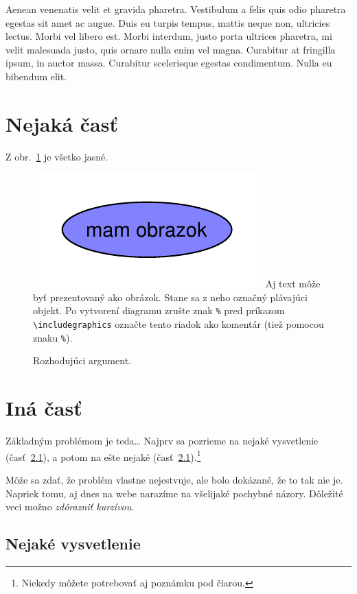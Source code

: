 \documentclass[10pt,twoside,slovak,a4paper]{article}
\begin{document}
Aenean venenatis velit et gravida pharetra. Vestibulum a felis quis odio pharetra egestas sit amet ac augue. Duis eu turpis tempus, mattis neque non, ultricies lectus. Morbi vel libero est. Morbi interdum, justo porta ultrices pharetra, mi velit malesuada justo, quis ornare nulla enim vel magna. Curabitur at fringilla ipsum, in auctor massa. Curabitur scelerisque egestas condimentum. Nulla eu bibendum elit.


\section{Nejaká časť} \label{nejaka}

Z obr.~\ref{f:rozhod} je všetko jasné. 

\begin{figure}[tbh]
\centering
\includegraphics[scale=1.0]{graf.pdf}
Aj text môže byť prezentovaný ako obrázok. Stane sa z neho označný plávajúci objekt. Po vytvorení diagramu zrušte znak \texttt{\%} pred príkazom \verb|\includegraphics| označte tento riadok ako komentár (tiež pomocou znaku \texttt{\%}).
\caption{Rozhodujúci argument.}
\label{f:rozhod}
\end{figure}



\section{Iná časť} \label{ina}

Základným problémom je teda\ldots{} Najprv sa pozrieme na nejaké vysvetlenie (časť~\ref{ina:nejake}), a potom na ešte nejaké (časť~\ref{ina:nejake}).\footnote{Niekedy môžete potrebovať aj poznámku pod čiarou.}

Môže sa zdať, že problém vlastne nejestvuje, ale bolo dokázané, že to tak nie je. Napriek tomu, aj dnes na webe narazíme na všelijaké pochybné názory. Dôležité veci možno \emph{zdôrazniť kurzívou}.


\subsection{Nejaké vysvetlenie} \label{ina:nejake}
\end{document}
